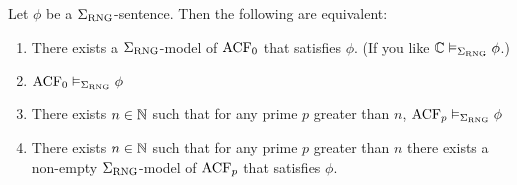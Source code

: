 \begin{prop}
    Let $\phi$ be a $\Sigma_{\mathrm{RNG}}$-sentence.
    Then the following are equivalent:
    \begin{enumerate}
        \item There exists a $\Sigma_{\mathrm{RNG}}$-model of $\operatorname{ACF}_0$ 
        that satisfies $\phi$.
        (If you like $\mathbb{C} \vDash_{\Sigma_{\mathrm{RNG}}} \phi$.)
        \item $\operatorname{ACF}_0 \vDash_{\Sigma_{\mathrm{RNG}}} \phi$
        \item There exists $n \in \mathbb{N}$ such that for any prime $p$
        greater than $n$,
        $\operatorname{ACF}_p \vDash_{\Sigma_{\mathrm{RNG}}} \phi$
        \item There exists $n \in \mathbb{N}$ such that for any prime $p$
        greater than $n$ there exists a non-empty $\Sigma_{\mathrm{RNG}}$-model
        of $\operatorname{ACF}_p$ that satisfies $\phi$.
    \end{enumerate}
\end{prop}
